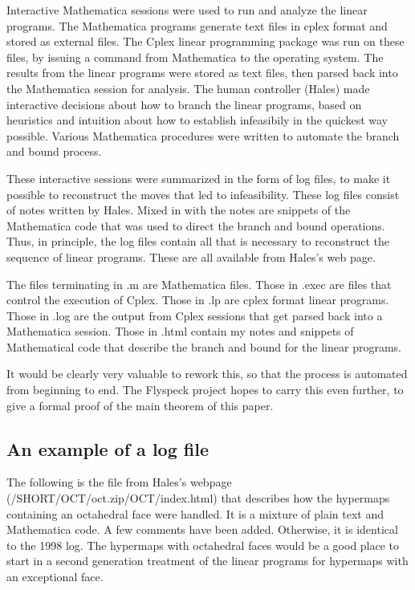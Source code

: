 Interactive Mathematica sessions were used to run and analyze the
linear programs.  The Mathematica programs generate text files in
cplex format and stored as external files. The Cplex linear
programming package was run on these files, by issuing a command
from Mathematica to the operating system.  The results from the
linear programs were stored as text files, then parsed back into
the Mathematica session for analysis.  The human controller
(Hales) made interactive decisions about how to branch the linear
programs, based on heuristics and intuition about how to establish
infeasibily in the quickest way possible.  Various Mathematica
procedures were written to automate the branch and bound process.

These interactive sessions were summarized in the form of log
files, to make it possible to reconstruct the moves that led to
infeasibility. These log files consist of notes written by Hales.
Mixed in with the notes are snippets of the Mathematica code that
was used to direct the branch and bound operations.  Thus, in
principle, the log files contain all that is necessary to
reconstruct the sequence of linear programs.  These are all
available from Hales's web page.

The files terminating in .m are Mathematica files.  Those in .exec
are files that control the execution of Cplex.  Those in .lp are
cplex format linear programs.  Those in .log are the output from
Cplex sessions that get parsed back into a Mathematica session.
Those in .html contain my notes and snippets of Mathematical code
that describe the branch and bound for the linear programs.

It would be clearly very valuable to rework this, so that the
process is automated from beginning to end.  The Flyspeck project
hopes to carry this even further, to give a formal proof of the
main theorem of this paper.

\subsection{An example of a log file}

The following is the file from Hales's webpage
(/SHORT/OCT/oct.zip/OCT/index.html) that describes how the
hypermaps containing an octahedral face were handled.  It is a
mixture of plain text and Mathematica code.  A few comments have
been added.  Otherwise, it is identical to the 1998 log.  The
hypermaps with octahedral faces would be a good place to start in
a second generation treatment of the linear programs for hypermaps
with an exceptional face.

